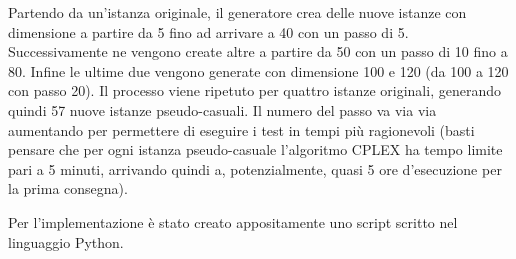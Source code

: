 Partendo da un'istanza originale, il generatore crea delle nuove istanze con dimensione a partire da 5 fino ad arrivare
a 40 con un passo di 5.
Successivamente ne vengono create altre a partire da 50 con un passo di 10 fino a 80.
Infine le ultime due vengono generate con dimensione 100 e 120 (da 100 a 120 con passo 20).
Il processo viene ripetuto per quattro istanze originali, generando quindi 57 nuove istanze pseudo-casuali.
Il numero del passo va via via aumentando per permettere di eseguire i test in tempi più ragionevoli
(basti pensare che per ogni istanza pseudo-casuale l'algoritmo CPLEX  ha tempo limite pari a 5 minuti,
arrivando quindi a, potenzialmente, quasi 5 ore d'esecuzione per la prima consegna).

Per l'implementazione è stato creato appositamente uno script scritto nel linguaggio Python.
